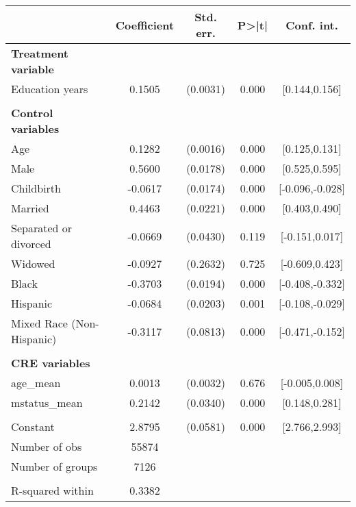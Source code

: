 {
\def\sym#1{\ifmmode^{#1}\else\(^{#1}\)\fi}
\begin{tabular}{l*{1}{cccc}}
\toprule
                    & Coefficient&   Std. err.&       P>|t|&  Conf. int.\\
\midrule
\textbf{Treatment variable}&            &            &            &            \\
Education years     &      0.1505&    (0.0031)&       0.000&[0.144,0.156]\\
\\ \textbf{Control variables}&            &            &            &            \\
Age                 &      0.1282&    (0.0016)&       0.000&[0.125,0.131]\\
Male                &      0.5600&    (0.0178)&       0.000&[0.525,0.595]\\
Childbirth          &     -0.0617&    (0.0174)&       0.000&[-0.096,-0.028]\\
Married             &      0.4463&    (0.0221)&       0.000&[0.403,0.490]\\
Separated or divorced&     -0.0669&    (0.0430)&       0.119&[-0.151,0.017]\\
Widowed             &     -0.0927&    (0.2632)&       0.725&[-0.609,0.423]\\
Black               &     -0.3703&    (0.0194)&       0.000&[-0.408,-0.332]\\
Hispanic            &     -0.0684&    (0.0203)&       0.001&[-0.108,-0.029]\\
Mixed Race (Non-Hispanic)&     -0.3117&    (0.0813)&       0.000&[-0.471,-0.152]\\
\\ \textbf{CRE variables}&            &            &            &            \\
age\_mean            &      0.0013&    (0.0032)&       0.676&[-0.005,0.008]\\
mstatus\_mean        &      0.2142&    (0.0340)&       0.000&[0.148,0.281]\\
                    &            &            &            &            \\
Constant            &      2.8795&    (0.0581)&       0.000&[2.766,2.993]\\
\midrule
Number of obs       &       55874&            &            &            \\
Number of groups    &        7126&            &            &            \\
\\ R-squared within &      0.3382&            &            &            \\

\end{tabular}}
